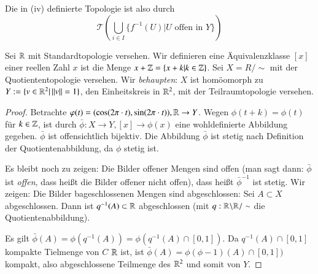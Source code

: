 \documentclass[a4paper,10pt]{scrartcl}
\begin{document}
Die in (iv) definierte Topologie ist also durch
\[
\mathcal T(\bigcup\limits_{i\in I} \{ f^{-1}(U)|U \text{ offen in } Y\} )
\]
\begin{ex}\label{thm:2.6} Sei $ \mathbb{R} $ mit Standardtopologie versehen. Wir definieren eine Äquivalenzklasse $ [x] $ einer reellen Zahl $ x $ ist die Menge $x+\mathbb{Z}=\{x+k|k\in \mathbb{Z}\}$. Sei $ X=R/\sim $ mit der Quotiententopologie versehen. Wir \emph{behaupten}: $ X $ ist homöomorph zu $ Y:=\{v\in \mathbb{R}^2|\, ||v||=1\} $, den Einheitskreis in $ \mathbb{R}^2 $, mit der Teilraumtopologie versehen. \fixme[fig12]
\begin{proof}
Betrachte $ \varphi(t)=(\cos(2\pi\cdot t),\sin(2\pi \cdot t)), \mathbb{R}\to Y $.
Wegen $ \phi(t+k)=\phi(t) $ für $ k\in \mathbb{Z} $, ist durch $ \bar\phi: X\to Y, [x]\to \phi(x) $ eine wohldefinierte Abbildung gegeben. $\bar \phi$ ist offensichtlich bijektiv. Die Abbildung $ \bar \phi  $ ist stetig nach Definition der Quotientenabbildung, da $ \phi $ stetig ist.

Es bleibt noch zu zeigen: Die Bilder offener Mengen sind offen (man sagt dann: $ \bar \phi $ ist \emph{offen}, dass heißt die Bilder offener nicht offen), dass heißt $ \bar \phi^{-1} $ ist stetig. Wir zeigen: Die Bilder bageschlossenen Mengen sind abgeschlossen: Sei $ A\subset X $ abgeschlossen. Dann ist $ q^{-1}(A)\subset \mathbb{R} $ abgeschlossen (mit $ q: \mathbb{R}\backslash \mathbb{R}/\sim $ die Quotientenabbildung).

Es gilt $ \bar \phi(A)=\phi(q^{-1}(A))=\phi(q^{-1}(A)\cap[0,1]) $. Da $ q^{-1}(A)\cap [0,1] $ kompakte Tielmenge von $C$ $ \mathbb{R} $ ist, ist $ \bar\phi(A)=\phi(\phi-1)(A)\cap[0,1]) $ kompakt, also abgeschlossene Teilmenge des $ \mathbb{R}^2  $ und somit von $ Y $.
\end{proof}
\end{ex}
\end{document}
